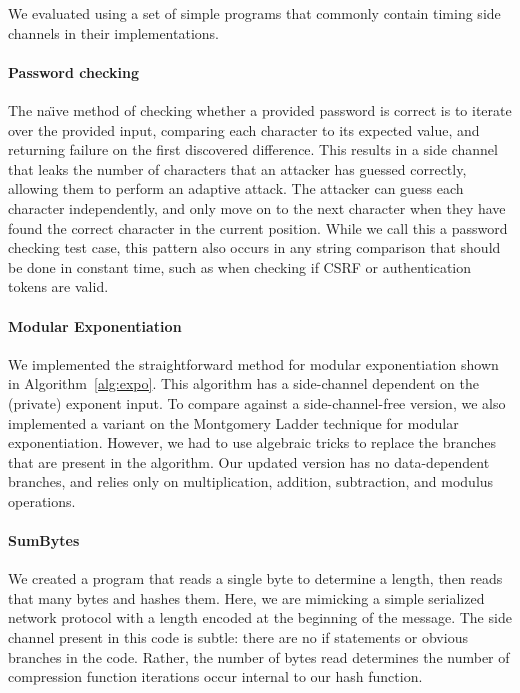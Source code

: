

We evaluated \jcupid using a set of simple programs that commonly contain timing
side channels in their implementations.


\paragraph{Password checking}
The na\"{\i}ve method of checking whether a provided password is correct is to iterate
over the provided input, comparing each character to its expected value, and
returning failure on the first discovered difference. This results in a side
channel that leaks the number of characters that an attacker has guessed
correctly, allowing them to perform an adaptive attack. The attacker can guess
each character independently, and only move on to the next character when they
have found the correct character in the current position. While we call this a
password checking test case, this pattern also occurs in any string comparison
that should be done in constant time, such as when checking if CSRF or
authentication tokens are valid.


\paragraph{Modular Exponentiation}
We implemented the straightforward method for modular exponentiation shown in
Algorithm~\ref{alg:expo}. This algorithm has a side-channel dependent on the
(private) exponent input. To compare against a side-channel-free version,
we also implemented a variant on the Montgomery Ladder
technique for modular exponentiation. However, we had to use algebraic tricks to
replace the branches that are present in the algorithm. Our updated version has no
data-dependent branches, and relies only on multiplication, addition,
subtraction, and modulus operations.


\paragraph{SumBytes}
We created a program that reads a single byte to determine a length, then reads
that many bytes and hashes them. Here, we are mimicking a simple serialized
network protocol with a length encoded at the beginning of the message. The side
channel present in this code is subtle: there are no if statements or obvious
branches in the code. Rather, the number of bytes read determines the number of
compression function iterations occur internal to our hash function.

